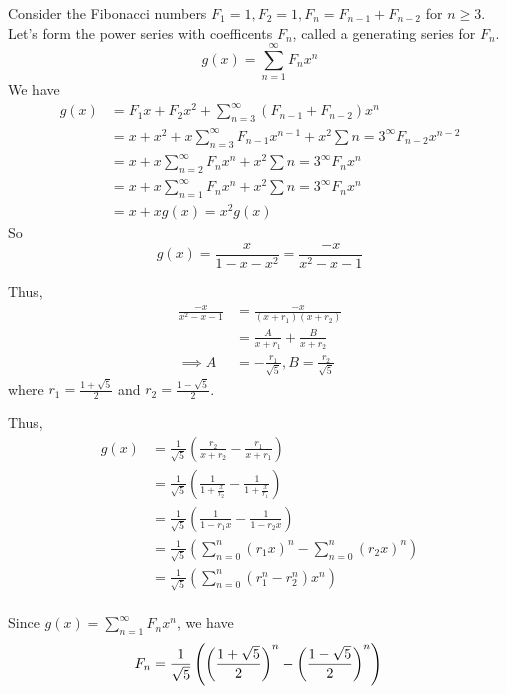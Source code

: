 \documentclass{article}
\begin{document}
      \begin{example}
        Consider the Fibonacci numbers $F_1 = 1, F_2 = 1, F_n = F_{n-1} + F_{n-2}$ for $n \geq 3$. Let's form the power series with coefficents $F_n$, called a generating series for $F_n$. \[
          g(x) = \sum_{n=1}^\infty F_nx^n
        \]
        We have
        \begin{align*}
          g(x) &= F_1x + F_2x^2 + \sum_{n=3}^\infty (F_{n-1} + F_{n-2})x^n\\
          &= x + x^2 + x\sum_{n=3}^\infty F_{n-1}x^{n-1} + x^2\sum{n=3}^\infty F_{n-2}x^{n-2}\\
          &= x + x\sum_{n=2}^\infty F_nx^n + x^2\sum{n=3}^\infty F_nx^n\\
          &= x + x\sum_{n=1}^\infty F_nx^n + x^2\sum{n=3}^\infty F_nx^n\\
          &= x + xg(x) = x^2g(x)
        \end{align*}
        So \[
          g(x) = \frac{x}{1-x-x^2} = \frac{-x}{x^2-x-1}
        \]

        Thus,
        \begin{align*}
          \frac{-x}{x^2-x-1} &= \frac{-x}{(x+r_1)(x+r_2)}\\
          &= \frac{A}{x+r_1} + \frac{B}{x+r_2}\\
          \implies A &= -\frac{r_1}{\sqrt{5}}, B = \frac{r_2}{\sqrt{5}}
        \end{align*} where $r_1 = \frac{1+\sqrt{5}}{2}$ and $r_2 = \frac{1-\sqrt{5}}{2}$.

        Thus,
        \begin{align*}
          g(x) &= \frac{1}{\sqrt{5}}\left(\frac{r_2}{x+r_2} - \frac{r_1}{x+r_1}\right)\\
          &= \frac{1}{\sqrt{5}}\left(\frac{1}{1+\frac{x}{r_2}} - \frac{1}{1+\frac{x}{r_1}}\right)\\
          &= \frac{1}{\sqrt{5}}\left(\frac{1}{1-r_1x} - \frac{1}{1-r_2x}\right) \tag{Using $r_1r_2 = -1$}\\
          &= \frac{1}{\sqrt{5}}\left(\sum_{n=0}^n (r_1x)^n - \sum_{n=0}^n (r_2x)^n\right)\\
          &= \frac{1}{\sqrt{5}}\left(\sum_{n=0}^n (r_1^n - r_2^n)x^n\right)\\
        \end{align*}

        Since $g(x) = \sum_{n=1}^\infty F_nx^n$, we have \[
          F_n = \frac{1}{\sqrt{5}} \left(\left(\frac{1+\sqrt{5}}{2}\right)^n - \left(\frac{1-\sqrt{5}}{2}\right)^n\right)\\
        \]
      \end{example}
\end{document}
